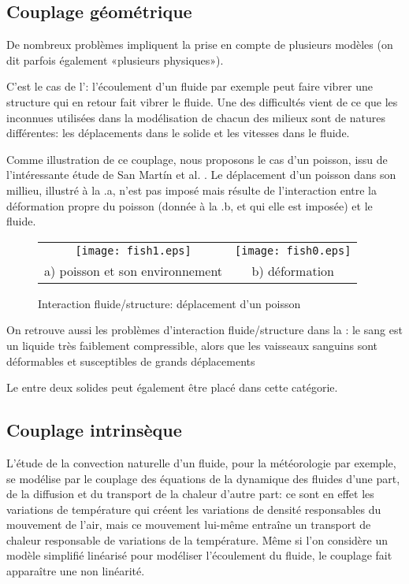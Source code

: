 \medskip
\subsection{Couplage géométrique}
De nombreux problèmes impliquent la prise en compte de plusieurs modèles (on dit parfois également «plusieurs physiques»).

C'est le cas de l': l'écoulement d'un fluide par exemple peut faire vibrer une structure qui en retour fait vibrer le fluide. Une des difficultés vient de ce que les inconnues utilisées dans la modélisation de chacun des milieux sont de natures différentes: les déplacements dans le solide et les vitesses dans le fluide.

Comme illustration de ce couplage, nous proposons le cas d'un poisson, issu de l'intéressante étude de San Mart\'in et al. \cite{bib-Fish}. Le déplacement d'un poisson dans son millieu, illustré à la .a, n'est pas imposé mais résulte de l'interaction entre la déformation propre du poisson (donnée à la .b, et qui elle est imposée) et le fluide.
\begin{figure}[htb]
\begin{center}
 \begin{tabular}{cc}
  \texttt{[image: fish1.eps]} &%
  \texttt{[image: fish0.eps]}\\
  a) poisson et son environnement & b) déformation
 \end{tabular}
\end{center}
\caption{Interaction fluide/structure: déplacement d'un poisson}
\label{Fig-fish}
\end{figure}

On retrouve aussi les problèmes d'interaction fluide/structure dans la : le sang est un liquide très faiblement compressible, alors que les vaisseaux sanguins sont déformables et susceptibles de grands déplacements

Le  entre deux solides peut également être placé dans cette catégorie.


\medskip
\subsection{Couplage intrinsèque}

L'étude de la convection naturelle d'un fluide, pour la météorologie par exemple, se modélise par le couplage des équations de la dynamique des fluides d'une part, de la diffusion et du transport de la chaleur d'autre part: ce sont en effet les variations de température qui créent les variations de densité responsables du mouvement de l'air, mais ce mouvement lui-même entraîne un transport de chaleur responsable de variations de la température. Même si l'on considère un modèle simplifié linéarisé pour modéliser l'écoulement du fluide, le couplage fait apparaître une non linéarité.

